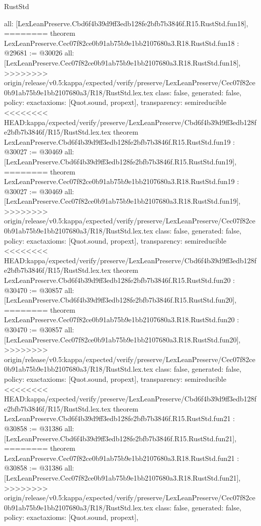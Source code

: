 \begin{lexlean}{RustStd}
\begin{coremodule}
{\begin{coremodule}
{{{{{{{{{{{{{{{{{{{{{  all: [LexLeanPreserve.Cbd6f4b39d9ff3edb128fe2bfb7b3846f.R15.RustStd.fun18],
========
theorem LexLeanPreserve.Cec07f82ce0b91ab75b9e1bb2107680a3.R18.RustStd.fun18 : @29681 := @30026 {
  all: [LexLeanPreserve.Cec07f82ce0b91ab75b9e1bb2107680a3.R18.RustStd.fun18],
>>>>>>>> origin/release/v0.5:kappa/expected/verify/preserve/LexLeanPreserve/Cec07f82ce0b91ab75b9e1bb2107680a3/R18/RustStd.lex.tex
  class: false,
  generated: false,
  policy: exact{axioms: [Quot.sound, propext]},
  transparency: semireducible
}
<<<<<<<< HEAD:kappa/expected/verify/preserve/LexLeanPreserve/Cbd6f4b39d9ff3edb128fe2bfb7b3846f/R15/RustStd.lex.tex
theorem LexLeanPreserve.Cbd6f4b39d9ff3edb128fe2bfb7b3846f.R15.RustStd.fun19 : @30027 := @30469 {
  all: [LexLeanPreserve.Cbd6f4b39d9ff3edb128fe2bfb7b3846f.R15.RustStd.fun19],
========
theorem LexLeanPreserve.Cec07f82ce0b91ab75b9e1bb2107680a3.R18.RustStd.fun19 : @30027 := @30469 {
  all: [LexLeanPreserve.Cec07f82ce0b91ab75b9e1bb2107680a3.R18.RustStd.fun19],
>>>>>>>> origin/release/v0.5:kappa/expected/verify/preserve/LexLeanPreserve/Cec07f82ce0b91ab75b9e1bb2107680a3/R18/RustStd.lex.tex
  class: false,
  generated: false,
  policy: exact{axioms: [Quot.sound, propext]},
  transparency: semireducible
}
<<<<<<<< HEAD:kappa/expected/verify/preserve/LexLeanPreserve/Cbd6f4b39d9ff3edb128fe2bfb7b3846f/R15/RustStd.lex.tex
theorem LexLeanPreserve.Cbd6f4b39d9ff3edb128fe2bfb7b3846f.R15.RustStd.fun20 : @30470 := @30857 {
  all: [LexLeanPreserve.Cbd6f4b39d9ff3edb128fe2bfb7b3846f.R15.RustStd.fun20],
========
theorem LexLeanPreserve.Cec07f82ce0b91ab75b9e1bb2107680a3.R18.RustStd.fun20 : @30470 := @30857 {
  all: [LexLeanPreserve.Cec07f82ce0b91ab75b9e1bb2107680a3.R18.RustStd.fun20],
>>>>>>>> origin/release/v0.5:kappa/expected/verify/preserve/LexLeanPreserve/Cec07f82ce0b91ab75b9e1bb2107680a3/R18/RustStd.lex.tex
  class: false,
  generated: false,
  policy: exact{axioms: [Quot.sound, propext]},
  transparency: semireducible
}
<<<<<<<< HEAD:kappa/expected/verify/preserve/LexLeanPreserve/Cbd6f4b39d9ff3edb128fe2bfb7b3846f/R15/RustStd.lex.tex
theorem LexLeanPreserve.Cbd6f4b39d9ff3edb128fe2bfb7b3846f.R15.RustStd.fun21 : @30858 := @31386 {
  all: [LexLeanPreserve.Cbd6f4b39d9ff3edb128fe2bfb7b3846f.R15.RustStd.fun21],
========
theorem LexLeanPreserve.Cec07f82ce0b91ab75b9e1bb2107680a3.R18.RustStd.fun21 : @30858 := @31386 {
  all: [LexLeanPreserve.Cec07f82ce0b91ab75b9e1bb2107680a3.R18.RustStd.fun21],
>>>>>>>> origin/release/v0.5:kappa/expected/verify/preserve/LexLeanPreserve/Cec07f82ce0b91ab75b9e1bb2107680a3/R18/RustStd.lex.tex
  class: false,
  generated: false,
  policy: exact{axioms: [Quot.sound, propext]},
}}}}}}}}}}}}}}}}}}}}}}}}}
\end{coremodule}}
\end{coremodule}
\end{lexlean}
